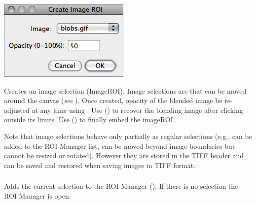 \begin{minipage}[c][1\totalheight][t]{0.35\columnwidth}%
\includegraphics[scale=0.55]{images/ImageToSelection}%
\end{minipage}%
\begin{minipage}[c][1\totalheight][t]{0.65\columnwidth}%
Creates an image selection (ImageROI).
Image selections are   that can be moved
around the canvas (\emph{see} ).
Once created, opacity of the blended image be re-adjusted at any time
using .
Use   ()
to recover the blending image after clicking outside its limits. Use
  ()
to finally embed the imageROI.%
\end{minipage}

Note that image selections behave only partially as regular selections
(e.g., can be added to the ROI Manager list, can be moved beyond image
boundaries but cannot be resized or rotated). However they are stored
in the TIFF header and can be saved and restored when saving images
in TIFF format.




\subsubsection[{\protect\userinterface{Add to Manager {[}t{]}}}]{\protect{}\label{sub:Add-to-Manager}\improvement{}}

Adds the current selection to the ROI Manager ().
If there is no selection the ROI Manager is open.


